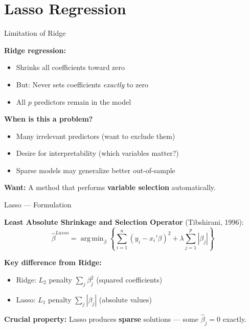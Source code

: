 \documentclass[10pt]{beamer}
\newcommand{\highlight}[1]{\textcolor{AccentOrange}{\textbf{#1}}}
\DeclareMathOperator*{\argmin}{arg\,min}
\begin{document}
\section{Lasso Regression}

\begin{frame}{Limitation of Ridge}

\textbf{Ridge regression:}
\begin{itemize}
  \item Shrinks all coefficients toward zero
  \item But: Never sets coefficients \emph{exactly} to zero
  \item All $p$ predictors remain in the model
\end{itemize}

\vspace{1em}
\textbf{When is this a problem?}
\begin{itemize}
  \item Many irrelevant predictors (want to exclude them)
  \item Desire for interpretability (which variables matter?)
  \item Sparse models may generalize better out-of-sample
\end{itemize}

\vspace{1em}
\textbf{Want:} A method that performs \highlight{variable selection} automatically.

\end{frame}


\begin{frame}{Lasso --- Formulation}

\textbf{Least Absolute Shrinkage and Selection Operator} (Tibshirani, 1996):
\[
\widehat{\beta}^{Lasso} = \argmin_\beta \left\{ \sum_{i=1}^n (y_i - x_i'\beta)^2 + \lambda \sum_{j=1}^p |\beta_j| \right\}
\]

\vspace{1em}
\textbf{Key difference from Ridge:}
\begin{itemize}
  \item Ridge: $L_2$ penalty $\sum_j \beta_j^2$ (squared coefficients)
  \item Lasso: $L_1$ penalty $\sum_j |\beta_j|$ (absolute values)
\end{itemize}

\vspace{1em}
\textbf{Crucial property:} Lasso produces \highlight{sparse} solutions --- some $\widehat{\beta}_j = 0$ exactly.

\end{frame}
\end{document}
